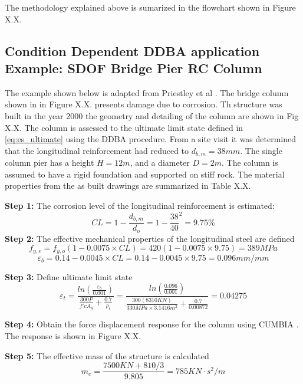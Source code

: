 The methodology explained above is sumarized in the flowchart shown in Figure X.X.

\subsection{Condition Dependent DDBA application Example: SDOF Bridge Pier RC Column}

The example shown below is adapted from Priestley et al \cites{Priestley2007}. The bridge column shown in in Figure X.X. presents damage due to corrosion. Th structure was built in the year 2000 the geometry and detailing of the column are shown in Fig X.X. The column is assessed to the ultimate limit state defined in \eqref{eq:es_ultimate} using the DDBA procedure. From a site visit it was determined that the longitudinal reinforcement had reduced to $d_{b,m}=38mm$. The single column pier has a height $H=12m$, and a diameter $D=2m$. The column is assumed to have a rigid foundation and supported on stiff rock. The material properties from the as built drawings are summarized in Table X.X.

\textbf{Step 1:} The corrosion level of the longitudinal reinforcement is estimated:
\begin{displaymath}
    CL=1-\frac{d_{b,m}}{d_{o}}=1-\frac{38}{40}^2=9.75\%
\end{displaymath}
\textbf{Step 2:} The effective mechanical properties of the longitudinal steel are defined
\begin{displaymath}
    f_{y,e}=f_{y,o}(1-0.0075\times CL)=420(1-0.0075\times 9.75)=389 MPa
\end{displaymath}
\begin{displaymath}
    \varepsilon_{b}=0.14-0.0045 \times CL = 0.14-0.0045 \times 9.75 = 0.096 mm/mm
\end{displaymath}

\textbf{Step 3:} Define ultimate limit state
\begin{displaymath}
    \varepsilon_{t}=\frac{ln(\frac{\varepsilon_{b}}{0.001})}{\frac{300P}{f'c A_{g}}+\frac{0.7}{\rho_{t}}}=\frac{ln(\frac{0.096}{0.001})}{\frac{300(8310KN)}{330MPa \times 3.1416 m^2}+\frac{0.7}{0.00872}}=0.04275
\end{displaymath}

\textbf{Step 4:} Obtain the force displacement response for the column using CUMBIA \cite{Montejo2007}. The response is shown in Figure X.X.

\textbf{Step 5:} The effective mass of the structure is calculated
\begin{displaymath}
    m_e=\frac{7500 KN + 810/3}{9.805}=785 KN \cdot s^2/m
\end{displaymath}

